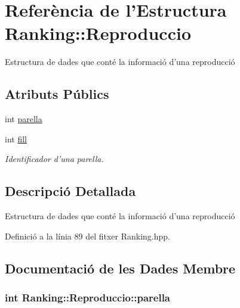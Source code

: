 \hypertarget{struct_ranking_1_1_reproduccio}{\section{Referència de l'Estructura Ranking\-:\-:Reproduccio}
\label{struct_ranking_1_1_reproduccio}
}


Estructura de dades que conté la informació d'una reproducció  


\subsection*{Atributs Públics}
\begin{DoxyCompactItemize}
\item 
int \hyperlink{struct_ranking_1_1_reproduccio_a51472066a4bc2b9bb765b5cfa501ecba}{parella}
\item 
int \hyperlink{struct_ranking_1_1_reproduccio_ada535ed71719e8eefc693b2f1e1b495e}{fill}
\begin{DoxyCompactList}\small\item\em Identificador d'una parella. \end{DoxyCompactList}\end{DoxyCompactItemize}


\subsection{Descripció Detallada}
Estructura de dades que conté la informació d'una reproducció 

Definició a la línia 89 del fitxer Ranking.\-hpp.



\subsection{Documentació de les Dades Membre}
\hypertarget{struct_ranking_1_1_reproduccio_a51472066a4bc2b9bb765b5cfa501ecba}{
\subsubsection[{parella}]{\setlength{\rightskip}{0pt plus 5cm}int Ranking\-::\-Reproduccio\-::parella}}\label{struct_ranking_1_1_reproduccio_a51472066a4bc2b9bb765b5cfa501ecba}


